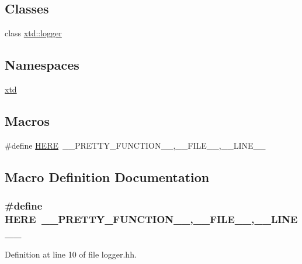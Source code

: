 \subsection*{Classes}
\begin{DoxyCompactItemize}
\item 
class \hyperlink{classxtd_1_1logger}{xtd\+::logger}
\end{DoxyCompactItemize}
\subsection*{Namespaces}
\begin{DoxyCompactItemize}
\item 
 \hyperlink{namespacextd}{xtd}
\end{DoxyCompactItemize}
\subsection*{Macros}
\begin{DoxyCompactItemize}
\item 
\#define \hyperlink{logger_8hh_a3fe03e23176f4fe277d1d3b41f3d3d06}{H\+E\+RE}~\+\_\+\+\_\+\+P\+R\+E\+T\+T\+Y\+\_\+\+F\+U\+N\+C\+T\+I\+O\+N\+\_\+\+\_\+,\+\_\+\+\_\+\+F\+I\+L\+E\+\_\+\+\_\+,\+\_\+\+\_\+\+L\+I\+N\+E\+\_\+\+\_\+
\end{DoxyCompactItemize}


\subsection{Macro Definition Documentation}
\subsubsection[{\texorpdfstring{H\+E\+RE}{HERE}}]{\setlength{\rightskip}{0pt plus 5cm}\#define H\+E\+RE~\+\_\+\+\_\+\+P\+R\+E\+T\+T\+Y\+\_\+\+F\+U\+N\+C\+T\+I\+O\+N\+\_\+\+\_\+,\+\_\+\+\_\+\+F\+I\+L\+E\+\_\+\+\_\+,\+\_\+\+\_\+\+L\+I\+N\+E\+\_\+\+\_\+}\hypertarget{logger_8hh_a3fe03e23176f4fe277d1d3b41f3d3d06}{}\label{logger_8hh_a3fe03e23176f4fe277d1d3b41f3d3d06}


Definition at line 10 of file logger.\+hh.

